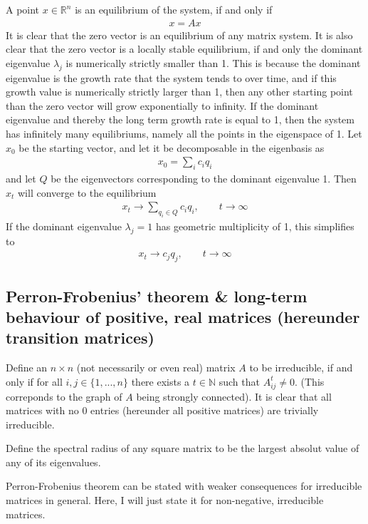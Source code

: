 \documentclass[12pt]{article}
\begin{document}
A point $x\in \mathbb{R}^n$ is an equilibrium of the system, if and only if
\begin{align}
x = Ax
\end{align}
It is clear that the zero vector is an equilibrium of any matrix system. It is also clear that the zero vector is a locally stable equilibrium, if and only the dominant eigenvalue $\lambda_j$ is numerically strictly smaller than 1. This is because the dominant eigenvalue is the growth rate that the system tends to over time, and if this growth value is numerically strictly larger than 1, then any other starting point than the zero vector will grow exponentially to infinity. If the dominant eigenvalue and thereby the long term growth rate is equal to 1, then the system has infinitely many equilibriums, namely all the points in the eigenspace of 1. Let $x_0$ be the starting vector, and let it be decomposable in the eigenbasis as
\begin{align}
x_0 = \sum_i c_i q_i
\end{align}
and let $Q$ be the eigenvectors corresponding to the dominant eigenvalue 1. Then $x_t$ will converge to the equilibrium
\begin{align}
x_t \to \sum_{q_i \in Q} c_i q_i, \qquad t\to \infty
\end{align}
If the dominant eigenvalue $\lambda_j = 1$ has geometric multiplicity of 1, this simplifies to
\begin{align}
x_t \to c_j q_j, \qquad t\to \infty
\end{align}

\subsection{Perron-Frobenius' theorem \& long-term behaviour of positive, real matrices (hereunder transition matrices)}

Define an $n\times n$ (not necessarily or even real) matrix $A$ to be irreducible, if and only if for all $i,j \in \{1,...,n\}$ there exists a $t \in \mathbb{N}$ such that $A^t_{ij}\neq 0$. (This correponds to the graph of $A$ being strongly connected). It is clear that all matrices with no 0 entries (hereunder all positive matrices) are trivially irreducible.

Define the spectral radius of any square matrix to be the largest absolut value of any of its eigenvalues.

Perron-Frobenius theorem can be stated with weaker consequences for irreducible matrices in general. Here, I will just state it for non-negative, irreducible matrices. 
\end{document}
